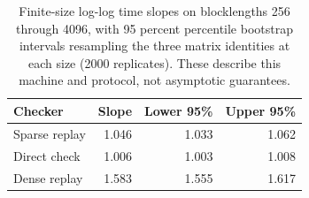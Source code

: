 \begin{table}
\centering
\small
\setlength{\tabcolsep}{3pt}
\caption{Finite-size log-log time slopes on blocklengths 256 through 4096, with 95 percent percentile bootstrap intervals resampling the three matrix identities at each size (2000 replicates). These describe this machine and protocol, not asymptotic guarantees.}
\label{tab:scaling-slopes}
\begin{tabular}{lrrr}
\toprule
Checker & Slope & Lower 95\% & Upper 95\% \\
\midrule
Sparse replay & 1.046 & 1.033 & 1.062 \\
Direct check & 1.006 & 1.003 & 1.008 \\
Dense replay & 1.583 & 1.555 & 1.617 \\
\bottomrule
\end{tabular}
\end{table}
